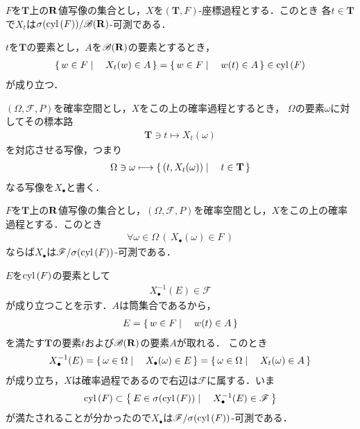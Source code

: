 	\begin{screen}
		\begin{thm}[座標過程は確率過程]\label{thm:coordinate_process_is_stochastic}
			$F$を$\mathbf{T}$上の$\mathbf{R}$値写像の集合とし，$X$を$(\mathbf{T},F)$-座標過程とする．このとき
			各$t \in \mathbf{T}$で$X_t$は$\sigma(\operatorname{cyl}\left(F\right))/\mathscr{B}(\mathbf{R})$-可測である．
		\end{thm}
	\end{screen}
	
	\begin{sketch}
		$t$を$\mathbf{T}$の要素とし，$A$を$\mathscr{B}(\mathbf{R})$の要素とするとき，
		\begin{align}
			\left\{\, w \in F \mid \quad X_t(w) \in A\, \right\}
			= \left\{\, w \in F \mid \quad w(t) \in A\, \right\}
			\in \operatorname{cyl}\left(F\right)
		\end{align}
		が成り立つ．
		\QED
	\end{sketch}
	
	$(\Omega,\mathscr{F},P)$を確率空間とし，$X$をこの上の確率過程とするとき，
	$\Omega$の要素$\omega$に対してその標本路
	\begin{align}
		\mathbf{T} \ni t \longmapsto X_t(\omega)
	\end{align}
	を対応させる写像，つまり
	\begin{align}
		\Omega \ni \omega \longmapsto \left\{\, (t,X_t(\omega)) \mid \quad t \in \mathbf{T}\, \right\}
	\end{align}
	なる写像を$X_\bullet$と書く．
	
	\begin{screen}
		\begin{thm}
			$F$を$\mathbf{T}$上の$\mathbf{R}$値写像の集合とし，$(\Omega,\mathscr{F},P)$を確率空間とし，$X$をこの上の確率過程とする．このとき
			\begin{align}
				\forall \omega \in \Omega\, \left(\, X_\bullet(\omega) \in F\, \right)
			\end{align}
			ならば$X_\bullet$は$\mathscr{F}/\sigma(\operatorname{cyl}\left(F\right))$-可測である．
		\end{thm}
	\end{screen}
	
	\begin{sketch}
		$E$を$\operatorname{cyl}\left(F\right)$の要素として
		\begin{align}
			X_\bullet^{-1}(E) \in \mathscr{F}
		\end{align}
		が成り立つことを示す．$A$は筒集合であるから，
		\begin{align}
			E = \left\{\, w \in F \mid \quad w(t) \in A\, \right\}
		\end{align}
		を満たす$\mathbf{T}$の要素$t$および$\mathscr{B}(\mathbf{R})$の要素$A$が取れる．
		このとき
		\begin{align}
			X_\bullet^{-1}(E) = \left\{\, \omega \in \Omega \mid \quad X_\bullet(\omega) \in E\, \right\}
			= \left\{\, \omega \in \Omega \mid \quad X_t(\omega) \in A\, \right\}
		\end{align}
		が成り立ち，$X$は確率過程であるので右辺は$\mathscr{F}$に属する．いま
		\begin{align}
			\operatorname{cyl}\left(F\right) \subset \left\{\, E \in \sigma(\operatorname{cyl}\left(F\right)) \mid \quad X_\bullet^{-1}(E) \in \mathscr{F}\, \right\}
		\end{align}
		が満たされることが分かったので$X_\bullet$は$\mathscr{F}/\sigma(\operatorname{cyl}\left(F\right))$-可測である．
		\QED
	\end{sketch}
	
